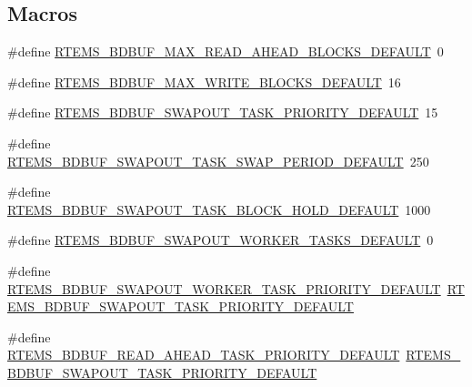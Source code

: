 \subsection*{Macros}
\begin{DoxyCompactItemize}
\item 
\#define \mbox{\hyperlink{group__rtems__bdbuf_gaae5144ea7d6721e55dfeda0c8df8d370}{R\+T\+E\+M\+S\+\_\+\+B\+D\+B\+U\+F\+\_\+\+M\+A\+X\+\_\+\+R\+E\+A\+D\+\_\+\+A\+H\+E\+A\+D\+\_\+\+B\+L\+O\+C\+K\+S\+\_\+\+D\+E\+F\+A\+U\+LT}}~0
\item 
\#define \mbox{\hyperlink{group__rtems__bdbuf_ga9572529188b3c315f4f0b0b160129dba}{R\+T\+E\+M\+S\+\_\+\+B\+D\+B\+U\+F\+\_\+\+M\+A\+X\+\_\+\+W\+R\+I\+T\+E\+\_\+\+B\+L\+O\+C\+K\+S\+\_\+\+D\+E\+F\+A\+U\+LT}}~16
\item 
\#define \mbox{\hyperlink{group__rtems__bdbuf_ga4389b6ef4328f397e91288e8479a944c}{R\+T\+E\+M\+S\+\_\+\+B\+D\+B\+U\+F\+\_\+\+S\+W\+A\+P\+O\+U\+T\+\_\+\+T\+A\+S\+K\+\_\+\+P\+R\+I\+O\+R\+I\+T\+Y\+\_\+\+D\+E\+F\+A\+U\+LT}}~15
\item 
\#define \mbox{\hyperlink{group__rtems__bdbuf_ga2286d9fcac2fdd6f19497da7faa82f81}{R\+T\+E\+M\+S\+\_\+\+B\+D\+B\+U\+F\+\_\+\+S\+W\+A\+P\+O\+U\+T\+\_\+\+T\+A\+S\+K\+\_\+\+S\+W\+A\+P\+\_\+\+P\+E\+R\+I\+O\+D\+\_\+\+D\+E\+F\+A\+U\+LT}}~250
\item 
\#define \mbox{\hyperlink{group__rtems__bdbuf_gab5083de2064c8c45031afe425b65812d}{R\+T\+E\+M\+S\+\_\+\+B\+D\+B\+U\+F\+\_\+\+S\+W\+A\+P\+O\+U\+T\+\_\+\+T\+A\+S\+K\+\_\+\+B\+L\+O\+C\+K\+\_\+\+H\+O\+L\+D\+\_\+\+D\+E\+F\+A\+U\+LT}}~1000
\item 
\#define \mbox{\hyperlink{group__rtems__bdbuf_ga43a9167effd55601db78237e927c0288}{R\+T\+E\+M\+S\+\_\+\+B\+D\+B\+U\+F\+\_\+\+S\+W\+A\+P\+O\+U\+T\+\_\+\+W\+O\+R\+K\+E\+R\+\_\+\+T\+A\+S\+K\+S\+\_\+\+D\+E\+F\+A\+U\+LT}}~0
\item 
\#define \mbox{\hyperlink{group__rtems__bdbuf_ga49a9f2ff52d57ceb4f3897da82942fee}{R\+T\+E\+M\+S\+\_\+\+B\+D\+B\+U\+F\+\_\+\+S\+W\+A\+P\+O\+U\+T\+\_\+\+W\+O\+R\+K\+E\+R\+\_\+\+T\+A\+S\+K\+\_\+\+P\+R\+I\+O\+R\+I\+T\+Y\+\_\+\+D\+E\+F\+A\+U\+LT}}~\mbox{\hyperlink{group__rtems__bdbuf_ga4389b6ef4328f397e91288e8479a944c}{R\+T\+E\+M\+S\+\_\+\+B\+D\+B\+U\+F\+\_\+\+S\+W\+A\+P\+O\+U\+T\+\_\+\+T\+A\+S\+K\+\_\+\+P\+R\+I\+O\+R\+I\+T\+Y\+\_\+\+D\+E\+F\+A\+U\+LT}}
\item 
\#define \mbox{\hyperlink{group__rtems__bdbuf_ga6e516e2a5ff9d285cef0aacb6c0768c1}{R\+T\+E\+M\+S\+\_\+\+B\+D\+B\+U\+F\+\_\+\+R\+E\+A\+D\+\_\+\+A\+H\+E\+A\+D\+\_\+\+T\+A\+S\+K\+\_\+\+P\+R\+I\+O\+R\+I\+T\+Y\+\_\+\+D\+E\+F\+A\+U\+LT}}~\mbox{\hyperlink{group__rtems__bdbuf_ga4389b6ef4328f397e91288e8479a944c}{R\+T\+E\+M\+S\+\_\+\+B\+D\+B\+U\+F\+\_\+\+S\+W\+A\+P\+O\+U\+T\+\_\+\+T\+A\+S\+K\+\_\+\+P\+R\+I\+O\+R\+I\+T\+Y\+\_\+\+D\+E\+F\+A\+U\+LT}}

\end{DoxyCompactItemize}
